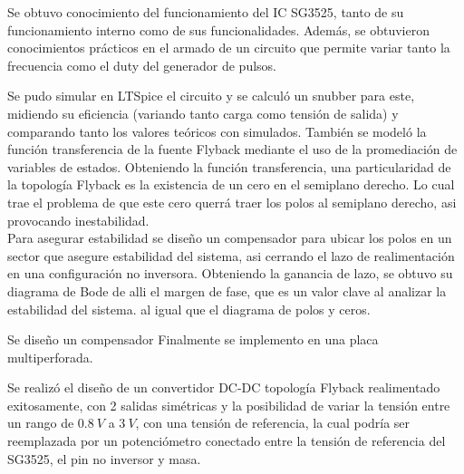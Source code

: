 
Se obtuvo conocimiento del funcionamiento del IC SG3525, tanto de su funcionamiento interno como de sus funcionalidades. Además, se obtuvieron conocimientos prácticos en el armado de un circuito que permite variar tanto la frecuencia como el duty del generador de pulsos. 

Se pudo simular en LTSpice el circuito y se calculó un snubber para este, midiendo su eficiencia (variando tanto carga como tensión de salida) y comparando tanto los valores teóricos con simulados. También se modeló la función transferencia de la fuente Flyback mediante el uso de la promediación de variables de estados. Obteniendo la función transferencia, una particularidad de la topología Flyback es la existencia de un cero en el semiplano derecho. Lo cual trae el problema de que este cero querrá traer los polos al semiplano derecho, asi provocando inestabilidad.\\
Para asegurar estabilidad se diseño un compensador  para ubicar los polos en un sector que asegure estabilidad del sistema, asi cerrando el lazo de realimentación en una configuración no inversora. Obteniendo la ganancia de lazo, se obtuvo su diagrama de Bode de alli el margen de fase, que es un valor clave al analizar la estabilidad del sistema. al igual que el diagrama de polos y ceros.

Se diseño un compensador Finalmente se implemento en una placa multiperforada. 
 
 Se realizó el diseño de un convertidor DC-DC topología Flyback realimentado exitosamente, con 2 salidas simétricas y la posibilidad de variar la tensión entre un rango de $0.8 \ V$ a $3 \ V$, con una tensión de referencia, la cual podría ser reemplazada por un potenciómetro conectado entre la tensión de referencia del SG3525, el pin no inversor y masa.
